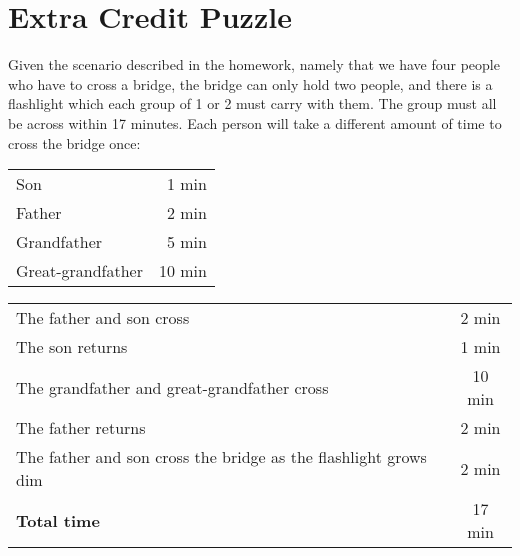 \section*{Extra Credit Puzzle}

Given the scenario described in the homework, namely that we have four people who have to cross a bridge, the bridge can only hold two people, and there is a flashlight which each group of 1 or 2 must carry with them. The group must all be across within 17 minutes. Each person will take a different amount of time to cross the bridge once:

\begin{center}
\begin{tabular}{l r}
	\centering
	Son & 1 min \\
	Father & 2 min \\
	Grandfather & 5 min \\
	Great-grandfather & 10 min \\
\end{tabular}
\end{center}

\begin{tabular}{l | c}
	The father and son cross & 2 min \\
	The son returns & 1 min \\
	The grandfather and great-grandfather cross & 10 min \\
	The father returns & 2 min \\
	The father and son cross the bridge as the flashlight grows dim & 2 min \\
	\hline
	\textbf{Total time} & 17 min
\end{tabular}